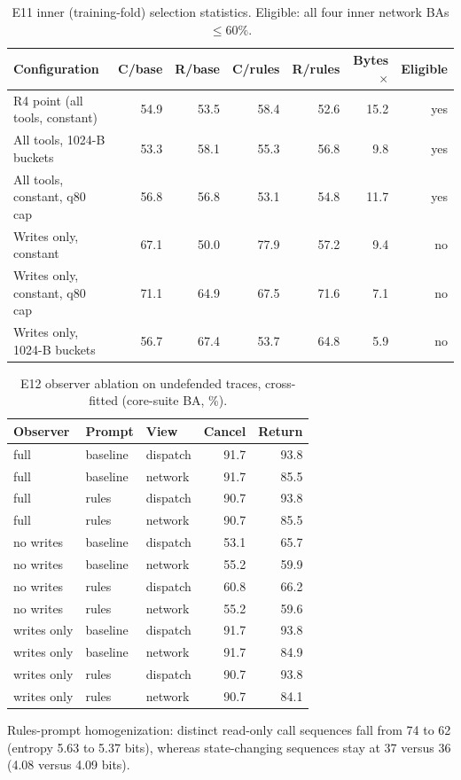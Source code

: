 \begin{table}[ht]\centering\small
\caption{E11 inner (training-fold) selection statistics. Eligible: all four inner network BAs $\le 60\%$.}
\begin{tabular}{@{}lrrrrrr@{}}\toprule
Configuration & C/base & R/base & C/rules & R/rules & Bytes$\times$ & Eligible\\\midrule
R4 point (all tools, constant) & 54.9 & 53.5 & 58.4 & 52.6 & 15.2 & yes\\
All tools, 1024-B buckets & 53.3 & 58.1 & 55.3 & 56.8 & 9.8 & yes\\
All tools, constant, q80 cap & 56.8 & 56.8 & 53.1 & 54.8 & 11.7 & yes\\
Writes only, constant & 67.1 & 50.0 & 77.9 & 57.2 & 9.4 & no\\
Writes only, constant, q80 cap & 71.1 & 64.9 & 67.5 & 71.6 & 7.1 & no\\
Writes only, 1024-B buckets & 56.7 & 67.4 & 53.7 & 64.8 & 5.9 & no\\
\bottomrule\end{tabular}\end{table}

\begin{table}[ht]\centering\small
\caption{E12 observer ablation on undefended traces, cross-fitted (core-suite BA, \%).}
\begin{tabular}{@{}lllrr@{}}\toprule
Observer & Prompt & View & Cancel & Return\\\midrule
full & baseline & dispatch & 91.7 & 93.8\\
full & baseline & network & 91.7 & 85.5\\
full & rules & dispatch & 90.7 & 93.8\\
full & rules & network & 90.7 & 85.5\\
no writes & baseline & dispatch & 53.1 & 65.7\\
no writes & baseline & network & 55.2 & 59.9\\
no writes & rules & dispatch & 60.8 & 66.2\\
no writes & rules & network & 55.2 & 59.6\\
writes only & baseline & dispatch & 91.7 & 93.8\\
writes only & baseline & network & 91.7 & 84.9\\
writes only & rules & dispatch & 90.7 & 93.8\\
writes only & rules & network & 90.7 & 84.1\\
\bottomrule\end{tabular}\end{table}

\noindent Rules-prompt homogenization: distinct read-only call sequences fall from 74 to 62 (entropy 5.63 to 5.37 bits), whereas state-changing sequences stay at 37 versus 36 (4.08 versus 4.09 bits).\par
